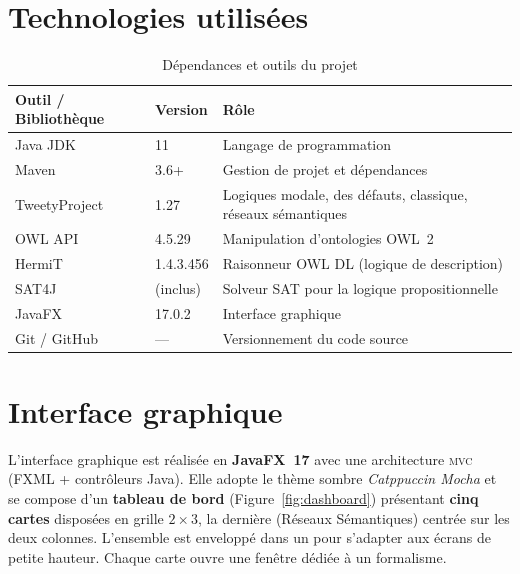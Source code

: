 \section{Technologies utilisées}

\begin{table}[H]
\centering
\caption{Dépendances et outils du projet}
\begin{tabularx}{\linewidth}{llX}
\toprule
\textbf{Outil / Bibliothèque} & \textbf{Version} & \textbf{Rôle} \\
\midrule
Java JDK               & 11        & Langage de programmation \\
Maven                  & 3.6+      & Gestion de projet et dépendances \\
TweetyProject          & 1.27      & Logiques modale, des défauts, classique, réseaux sémantiques \\
OWL API                & 4.5.29    & Manipulation d'ontologies OWL~2 \\
HermiT                 & 1.4.3.456 & Raisonneur OWL DL (logique de description) \\
SAT4J                  & (inclus)  & Solveur SAT pour la logique propositionnelle \\
JavaFX                 & 17.0.2    & Interface graphique \\
Git / GitHub           & ---       & Versionnement du code source \\
\bottomrule
\end{tabularx}
\end{table}

\section{Interface graphique}

L'interface graphique est réalisée en \textbf{JavaFX~17} avec une architecture
\textsc{mvc} (FXML + contrôleurs Java).
Elle adopte le thème sombre \emph{Catppuccin Mocha} et se compose d'un
\textbf{tableau de bord} (Figure~\ref{fig:dashboard}) présentant
\textbf{cinq cartes} disposées en grille $2\times 3$, la dernière (Réseaux
Sémantiques) centrée sur les deux colonnes. L'ensemble est enveloppé dans un
 pour s'adapter aux écrans de petite hauteur. Chaque carte
ouvre une fenêtre dédiée à un formalisme.

